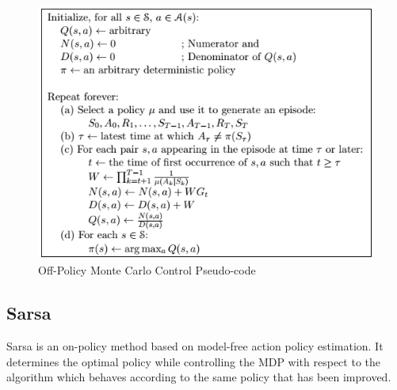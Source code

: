 \documentclass[paper=a4, fontsize=11pt]{scrartcl}
\numberwithin{equation}{section}		%
\numberwithin{figure}{section}			%
\numberwithin{table}{section}				%
\begin{document}
\begin{figure}[H] \centering
\includegraphics[scale=0.8]{offPolicyPseudo.png}
\caption{Off-Policy Monte Carlo Control Pseudo-code} \label{figure:offPolicy}
\end{figure}


\subsection{\textbf {Sarsa}}
Sarsa is an on-policy method based on model-free action policy estimation. It determines the optimal policy while controlling the MDP with respect to the algorithm which behaves according to the same policy that has been improved.
\end{document}
